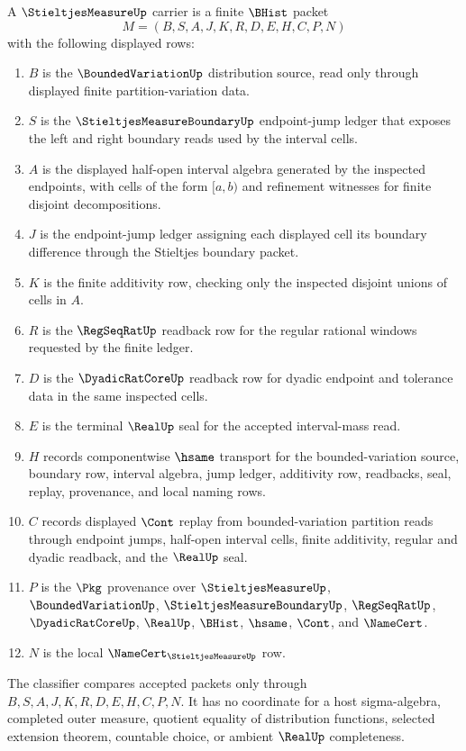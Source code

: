\begin{definition}
\label{def:stieltjes-measure-carrier}
A $\StieltjesMeasureUp$ carrier is a finite $\BHist$ packet
$$
M=(B,S,A,J,K,R,D,E,H,C,P,N)
$$
with the following displayed rows:
\begin{enumerate}
\item $B$ is the $\BoundedVariationUp$ distribution source, read only through displayed finite partition-variation data.
\item $S$ is the $\StieltjesMeasureBoundaryUp$ endpoint-jump ledger that exposes the left and right boundary reads used by the interval cells.
\item $A$ is the displayed half-open interval algebra generated by the inspected endpoints, with cells of the form $[a,b)$ and refinement witnesses for finite disjoint decompositions.
\item $J$ is the endpoint-jump ledger assigning each displayed cell its boundary difference through the Stieltjes boundary packet.
\item $K$ is the finite additivity row, checking only the inspected disjoint unions of cells in $A$.
\item $R$ is the $\RegSeqRatUp$ readback row for the regular rational windows requested by the finite ledger.
\item $D$ is the $\DyadicRatCoreUp$ readback row for dyadic endpoint and tolerance data in the same inspected cells.
\item $E$ is the terminal $\RealUp$ seal for the accepted interval-mass read.
\item $H$ records componentwise $\hsame$ transport for the bounded-variation source, boundary row, interval algebra, jump ledger, additivity row, readbacks, seal, replay, provenance, and local naming rows.
\item $C$ records displayed $\Cont$ replay from bounded-variation partition reads through endpoint jumps, half-open interval cells, finite additivity, regular and dyadic readback, and the $\RealUp$ seal.
\item $P$ is the $\Pkg$ provenance over $\StieltjesMeasureUp$, $\BoundedVariationUp$, $\StieltjesMeasureBoundaryUp$, $\RegSeqRatUp$, $\DyadicRatCoreUp$, $\RealUp$, $\BHist$, $\hsame$, $\Cont$, and $\NameCert$.
\item $N$ is the local $\NameCert_{\StieltjesMeasureUp}$ row.
\end{enumerate}
The classifier compares accepted packets only through $B,S,A,J,K,R,D,E,H,C,P,N$. It has no coordinate for a host sigma-algebra, completed outer measure, quotient equality of distribution functions, selected extension theorem, countable choice, or ambient $\RealUp$ completeness.
\end{definition}

